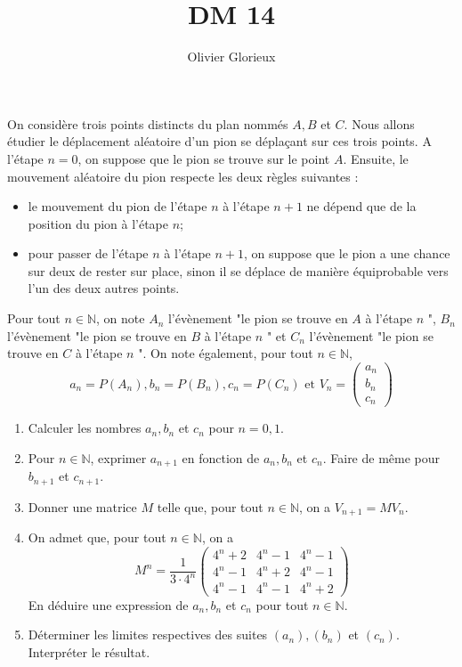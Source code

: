\documentclass[a4paper, 11pt,reqno]{article}
\author{Olivier Glorieux}
\begin{document}
\title{DM 14 }






\begin{exercice}

On considère trois points distincts du plan nommés $A, B$ et $C$. Nous allons étudier le déplacement aléatoire d'un pion se déplaçant sur ces trois points. A l'étape $n=0$, on suppose que le pion se trouve sur le point $A$. Ensuite, le mouvement aléatoire du pion respecte les deux règles suivantes :
\begin{itemize}
\item  le mouvement du pion de l'étape $n$ à l'étape $n+1$ ne dépend que de la position du pion à l'étape $n$;
\item pour passer de l'étape $n$ à l'étape $n+1$, on suppose que le pion a une chance sur deux de rester sur place, sinon il se déplace de manière équiprobable vers l'un des deux autres points.

\end{itemize}

Pour tout $n \in \mathbb{N}$, on note $A_{n}$ l'évènement "le pion se trouve en $A$ à l'étape $n$ ", $B_{n}$ l'évènement "le pion se trouve en $B$ à l'étape $n$ " et $C_{n}$ l'évènement "le pion se trouve en $C$ à l'étape $n$ ". On note également, pour tout $n \in \mathbb{N}$,
$$
a_{n}=P\left(A_{n}\right), b_{n}=P\left(B_{n}\right), c_{n}=P\left(C_{n}\right) \text { et } V_{n}=\left(\begin{array}{l}
a_{n} \\
b_{n} \\
c_{n}
\end{array}\right)
$$
\begin{enumerate}
\item  Calculer les nombres $a_{n}, b_{n}$ et $c_{n}$ pour $n=0,1$.
\item  Pour $n \in \mathbb{N}$, exprimer $a_{n+1}$ en fonction de $a_{n}, b_{n}$ et $c_{n} .$ Faire de même pour $b_{n+1}$ et $c_{n+1}$.
\item  Donner une matrice $M$ telle que, pour tout $n \in \mathbb{N}$, on a $V_{n+1}=M V_{n}$.
\item  On admet que, pour tout $n \in \mathbb{N}$, on a
$$
M^{n}=\frac{1}{3 \cdot 4^{n}}\left(\begin{array}{ccc}
4^{n}+2 & 4^{n}-1 & 4^{n}-1 \\
4^{n}-1 & 4^{n}+2 & 4^{n}-1 \\
4^{n}-1 & 4^{n}-1 & 4^{n}+2
\end{array}\right)
$$
En déduire une expression de $a_{n}, b_{n}$ et $c_{n}$ pour tout $n \in \mathbb{N}$.
\item  Déterminer les limites respectives des suites $\left(a_{n}\right),\left(b_{n}\right)$ et $\left(c_{n}\right)$. Interpréter le résultat.
\end{enumerate}


\end{exercice}
\end{document}
